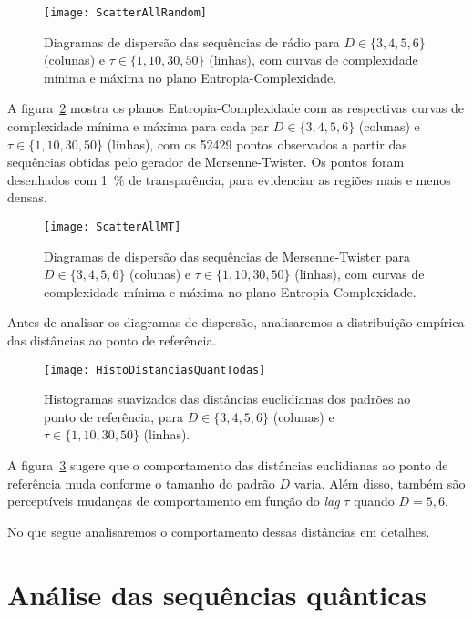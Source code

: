 \begin{figure}[hbt]
	\centering
	\texttt{[image: ScatterAllRandom]}
	\caption{Diagramas de dispersão das sequências de rádio para $D\in\{3,4,5,6\}$ (colunas) e $\tau\in\{1,10,30,50\}$ (linhas), com curvas de complexidade mínima e máxima no plano Entropia-Complexidade.}\label{Fig:ScatterAllRandom}
\end{figure}

A figura~\ref{Fig:ScatterAllMT} mostra os planos Entropia-Complexidade com as respectivas curvas de complexidade mínima e máxima para cada par $D\in\{3,4,5,6\}$ (colunas) e $\tau\in\{1,10,30,50\}$ (linhas), com os \num{52429} pontos observados a partir das sequências obtidas pelo gerador de Mersenne-Twister.
Os pontos foram desenhados com \SI{1}{\percent} de transparência, para evidenciar as regiões mais e menos densas.

\begin{figure}[hbt]
	\centering
	\texttt{[image: ScatterAllMT]}
	\caption{Diagramas de dispersão das sequências de Mersenne-Twister para $D\in\{3,4,5,6\}$ (colunas) e $\tau\in\{1,10,30,50\}$ (linhas), com curvas de complexidade mínima e máxima no plano Entropia-Complexidade.}\label{Fig:ScatterAllMT}
\end{figure}

Antes de analisar os diagramas de dispersão, analisaremos a distribuição empírica das distâncias ao ponto de referência.

\begin{figure}[hbt]
\centering
\texttt{[image: HistoDistanciasQuantTodas]}
\caption{Histogramas suavizados das distâncias euclidianas dos padrões ao ponto de referência, para $D\in\{3,4,5,6\}$ (colunas) e $\tau\in\{1,10,30,50\}$ (linhas).}\label{Fig:HistoDistanciasQuantTodas}
\end{figure}

A figura~\ref{Fig:HistoDistanciasQuantTodas} sugere que o comportamento das distâncias euclidianas ao ponto de referência muda conforme o tamanho do padrão $D$ varia.
Além disso, também são perceptíveis mudanças de comportamento em função do \textit{lag} $\tau$ quando $D=5,6$.

No que segue analisaremos o comportamento dessas distâncias em detalhes.

\section{Análise das sequências quânticas}

